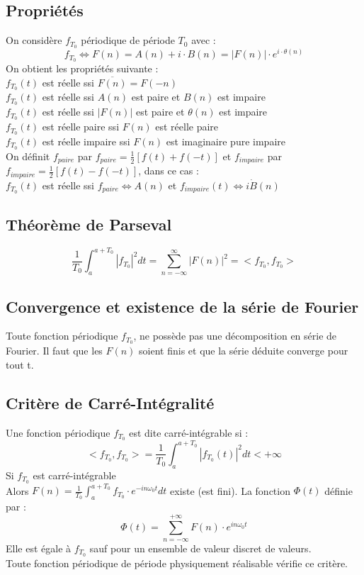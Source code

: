 \documentclass[10pt,a4paper,twoside]{article}
\begin{document}
\subsection{Propriétés}
On considère $f_{T_{0}}$ périodique de période $T_{0}$ avec :
$$f_{T_{0}} \Leftrightarrow F(n) = A(n)+i\cdot B(n) = |F(n)|\cdot e^{i\cdot \theta(n)}$$
On obtient les propriétés suivante :\\
$f_{T_{0}}(t)$ est réelle ssi $\overline{F(n)} = F(-n)$\\
$f_{T_{0}}(t)$ est réelle ssi $A(n)$ est paire et $B(n)$ est impaire\\
$f_{T_{0}}(t)$ est réelle ssi $|F(n)|$ est paire et $\theta(n)$ est impaire\\
$f_{T_{0}}(t)$ est réelle paire ssi $F(n)$ est réelle paire\\
$f_{T_{0}}(t)$ est réelle impaire ssi $F(n)$ est imaginaire pure impaire\\
On définit $f_{paire}$ par $f_{paire} = \frac{1}{2}[f(t)+f(-t)]$ et $f_{impaire}$ par $f_{impaire} = \frac{1}{2}[f(t)-f(-t)]$, dans ce cas :\\
$f_{T_{0}}(t)$ est réelle ssi $f_{paire} \Leftrightarrow A(n)$ et $f_{impaire}(t) \Leftrightarrow i \dot B(n)$\\

\subsection{Théorème de Parseval}
$$\frac{1}{T_{0}} \int_{a}^{a+T_{0}}|f_{T_{0}}|^{2}dt=\sum_{n=-\infty}^{\infty}|F(n)|^{2}=<f_{T_{0}},f_{T_{0}}>$$

\subsection{Convergence et existence de la série de Fourier}
Toute fonction périodique $f_{T_{0}}$, ne possède pas une décomposition en série de Fourier. Il faut que les $F(n)$ soient finis et que la série déduite converge pour tout t.

\subsection{Critère de Carré-Intégralité}
Une fonction périodique $f_{T_{0}}$ est dite carré-intégrable si :
$$<f_{T_{0}}, f_{T_{0}}> = \frac{1}{T_{0}} \int_{a}^{a+T_{0}}|f_{T_{0}}(t)|^{2} dt < +\infty$$
Si $f_{T_{0}}$ est carré-intégrable\\
Alors $F(n)=\frac{1}{T_{0}} \int_{a}^{a+T_{0}}f_{T_{0}} \cdot e^{-in\omega_{0}t}dt$ existe (est fini).
La fonction $\Phi(t)$ définie par :
$$\Phi(t) = \sum_{n=-\infty}^{+\infty} F(n)\cdot e^{in\omega_{0}t}$$
Elle est égale à $f_{T_{0}}$ sauf pour un ensemble de valeur discret de valeurs.\\
Toute fonction périodique de période physiquement réalisable vérifie ce critère.
\end{document}

